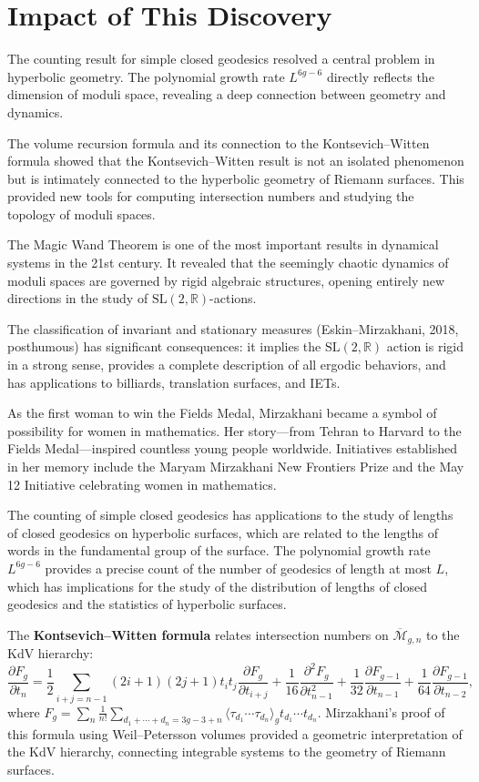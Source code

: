 \section{Impact of This Discovery}

The counting result for simple closed geodesics resolved a central problem in hyperbolic geometry. The polynomial growth rate $L^{6g-6}$ directly reflects the dimension of moduli space, revealing a deep connection between geometry and dynamics.

The volume recursion formula and its connection to the Kontsevich--Witten formula showed that the Kontsevich--Witten result is not an isolated phenomenon but is intimately connected to the hyperbolic geometry of Riemann surfaces. This provided new tools for computing intersection numbers and studying the topology of moduli spaces.

The Magic Wand Theorem is one of the most important results in dynamical systems in the 21st century. It revealed that the seemingly chaotic dynamics of moduli spaces are governed by rigid algebraic structures, opening entirely new directions in the study of $\mathrm{SL}(2,\mathbb{R})$-actions.

The classification of invariant and stationary measures (Eskin--Mirzakhani, 2018, posthumous) has significant consequences: it implies the $\mathrm{SL}(2,\mathbb{R})$ action is rigid in a strong sense, provides a complete description of all ergodic behaviors, and has applications to billiards, translation surfaces, and IETs.

As the first woman to win the Fields Medal, Mirzakhani became a symbol of possibility for women in mathematics. Her story---from Tehran to Harvard to the Fields Medal---inspired countless young people worldwide. Initiatives established in her memory include the Maryam Mirzakhani New Frontiers Prize and the May 12 Initiative celebrating women in mathematics.

The counting of simple closed geodesics has applications to the study of lengths of closed geodesics on hyperbolic surfaces, which are related to the lengths of words in the fundamental group of the surface. The polynomial growth rate $L^{6g-6}$ provides a precise count of the number of geodesics of length at most $L$, which has implications for the study of the distribution of lengths of closed geodesics and the statistics of hyperbolic surfaces.

The \textbf{Kontsevich--Witten formula} relates intersection numbers on $\overline{\mathcal{M}}_{g,n}$ to the KdV hierarchy:
\[
\frac{\partial F_g}{\partial t_n} = \frac{1}{2} \sum_{i+j=n-1} (2i+1)(2j+1) t_i t_j \frac{\partial F_g}{\partial t_{i+j}} + \frac{1}{16} \frac{\partial^2 F_g}{\partial t_{n-1}^2} + \frac{1}{32} \frac{\partial F_{g-1}}{\partial t_{n-1}} + \frac{1}{64} \frac{\partial F_{g-1}}{\partial t_{n-2}},
\]
where $F_g = \sum_{n} \frac{1}{n!} \sum_{d_1+\cdots+d_n=3g-3+n} \langle\tau_{d_1}\cdots\tau_{d_n}\rangle_g t_{d_1}\cdots t_{d_n}$. Mirzakhani's proof of this formula using Weil--Petersson volumes provided a geometric interpretation of the KdV hierarchy, connecting integrable systems to the geometry of Riemann surfaces.

